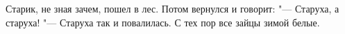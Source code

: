 Старик, не зная зачем, пошел в лес. Потом вернулся и говорит: "--- Старуха, а старуха! "--- Старуха так и повалилась. С тех пор все зайцы зимой белые.
